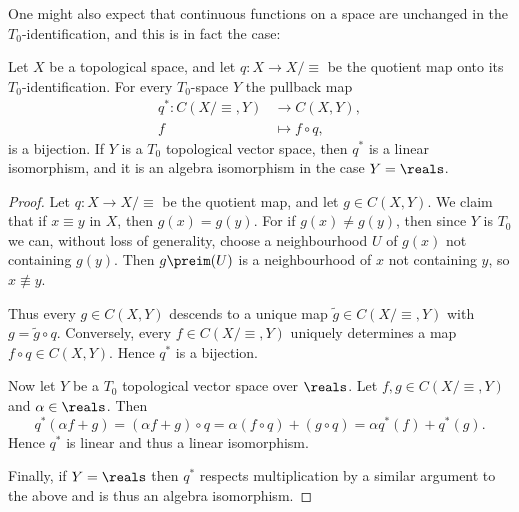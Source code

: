 \documentclass[article, a4paper, 11pt, oneside]{memoir}
\numberwithin{equation}{chapter}
\begin{document}
One might also expect that continuous functions on a space are unchanged in the $T_0$-identification, and this is in fact the case:

\begin{proposition}
    \label{thm:T0-identification-continuous-functions}
    Let $X$ be a topological space, and let $q \colon X \to X/{\equiv}$ be the quotient map onto its $T_0$-identification. For every $T_0$-space $Y$ the pullback map
    \begin{align*}
        q^* \colon C(X/{\equiv},Y) &\to C(X,Y), \\
        f &\mapsto f \circ q,
    \end{align*}
    is a bijection. If $Y$ is a $T_0$ topological vector space\footnotemark, then $q^*$ is a linear isomorphism, and it is an algebra isomorphism in the case $Y = \reals$. %
\end{proposition}

\begin{proof}
    Let $q \colon X \to X/{\equiv}$ be the quotient map, and let $g \in C(X,Y)$. We claim that if $x \equiv y$ in $X$, then $g(x) = g(y)$. For if $g(x) \neq g(y)$, then since $Y$ is $T_0$ we can, without loss of generality, choose a neighbourhood $U$ of $g(x)$ not containing $g(y)$. Then $g\preim(U)$ is a neighbourhood of $x$ not containing $y$, so $x \not\equiv y$.

    Thus every $g \in C(X,Y)$ descends to a unique map $\tilde{g} \in C(X/{\equiv},Y)$ with $g = \tilde{g} \circ q$. Conversely, every $f \in C(X/{\equiv},Y)$ uniquely determines a map $f \circ q \in C(X,Y)$. Hence $q^*$ is a bijection.

    Now let $Y$ be a $T_0$ topological vector space over $\reals$. Let $f,g \in C(X/{\equiv},Y)$ and $\alpha \in \reals$. Then
    \begin{equation*}
        q^*(\alpha f + g)
            = (\alpha f + g) \circ q
            = \alpha (f \circ q) + (g \circ q)
            = \alpha q^*(f) + q^*(g).
    \end{equation*}
    Hence $q^*$ is linear and thus a linear isomorphism.

    Finally, if $Y = \reals$ then $q^*$ respects multiplication by a similar argument to the above and is thus an algebra isomorphism.
\end{proof}
\end{document}
